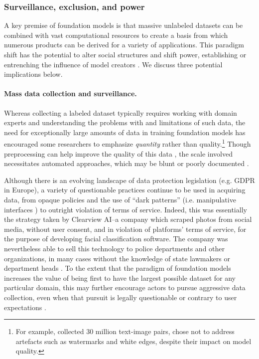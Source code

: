 \subsubsection{Surveillance, exclusion, and power}
\label{sec:ethics-surveillance}

A key premise of foundation models is that massive unlabeled datasets can be combined with vast computational resources to create a basis from which numerous products can be derived for a variety of applications. This paradigm shift has the potential to alter social structures and shift power, establishing or entrenching the influence of model creators \citep{zimmerman_2020}. We discuss three potential implications below.

\paragraph{Mass data collection and surveillance.} 

Whereas collecting a labeled dataset typically requires working with domain experts and understanding the problems with and limitations of such data, the need for exceptionally large amounts of data in training foundation models has encouraged some researchers to emphasize \emph{quantity} rather than quality.\footnote{For example, \citet{ding.2021} collected 30 million text-image pairs, chose not to address artefacts such as watermarks and white edges, despite their impact on model quality.} Though preprocessing can help improve the quality of this data \citep[e.g. ][]{brown2020gpt3}, the scale involved necessitates automated approaches, which may be blunt or poorly documented \citep{dodge.2021.documenting}.

Although there is an evolving landscape of data protection legislation (e.g. GDPR in Europe), a variety of questionable practices continue to be used in acquiring data, from opaque policies \citep{obar.2020} and the use of ``dark patterns'' (i.e. manipulative interfaces \citep{narayanan.2020}) to outright violation of terms of service. Indeed, this was essentially the strategy taken by Clearview AI--a company which scraped photos from social media, without user consent, and in violation of platforms' terms of service, for the purpose of developing facial classification software. The company was nevertheless able to sell this technology to police departments and other organizations, in many cases without the knowledge of state lawmakers or department heads \citep{mac.2021}. To the extent that the paradigm of foundation models increases the value of being first to have the largest possible dataset for any particular domain, this may further encourage actors to pursue aggressive data collection, even when that pursuit is legally questionable or contrary to user expectations \citep{nissenbaum.2009, zuboff.2018}.

